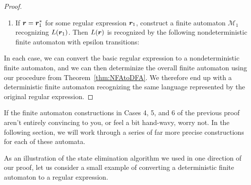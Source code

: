 \begin{theorem}
\begin{proof}
\begin{enumerate}
\item If $\bm r = \bm r_{1}^{*}$ for some regular expression $\bm r_{1}$, construct a finite automaton $\mathcal{M}_{1}$ recognizing $L(\bm r_{1})$. Then $L(\bm r)$ is recognized by the following nondeterministic finite automaton with epsilon transitions:
\begin{center}
\end{center}
\end{enumerate}
In each case, we can convert the basic regular expression to a nondeterministic finite automaton, and we can then determinize the overall finite automaton using our procedure from Theorem~\ref{thm:NFAtoDFA}. We therefore end up with a deterministic finite automaton recognizing the same language represented by the original regular expression.
\end{proof}
\end{theorem}

\begin{remark}
If the finite automaton constructions in Cases 4, 5, and 6 of the previous proof aren't entirely convincing to you, or feel a bit hand-wavy, worry not. In the following section, we will work through a series of far more precise constructions for each of these automata.
\end{remark}

As an illustration of the state elimination algorithm we used in one direction of our proof, let us consider a small example of converting a deterministic finite automaton to a regular expression.

